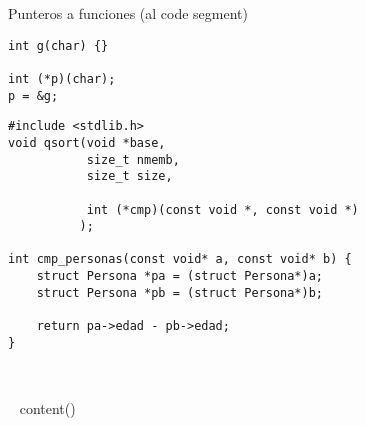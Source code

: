 \begin{frame}[fragile]{Punteros a funciones (al code segment)}
         \begin{lstlisting}[style=normal]
int g(char) {}

int (*p)(char);
p = &g;
         \end{lstlisting}
\pause
         \begin{lstlisting}[style=normal]
#include <stdlib.h>
void qsort(void *base,
           size_t nmemb,
           size_t size,

           int (*cmp)(const void *, const void *)
          );

int cmp_personas(const void* a, const void* b) {
    struct Persona *pa = (struct Persona*)a;
    struct Persona *pb = (struct Persona*)b;

    return pa->edad - pb->edad;
}

         \end{lstlisting}
\end{frame}

~%

~{ content() }~





